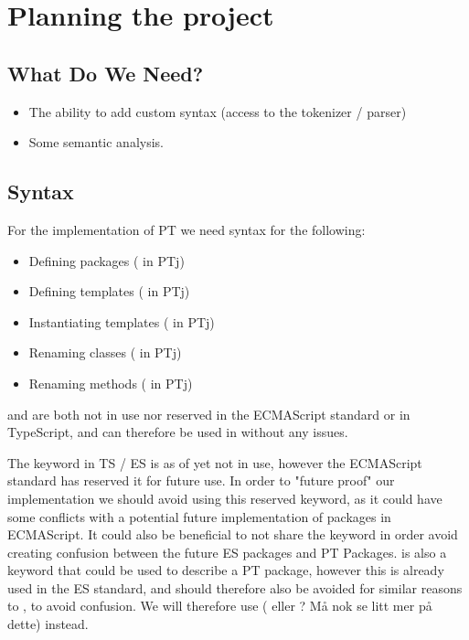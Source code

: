 
\chapter{Planning the project}\label{ch:planning-the-project}

\section{What Do We Need?}\label{sec:what-do-we-need}

\begin{itemize}
    \item The ability to add custom syntax (access to the tokenizer / parser)
    \item Some semantic analysis.
\end{itemize}

\section{Syntax}\label{sec:syntax}

For the implementation of PT we need syntax for the following:

\begin{itemize}
    \item Defining packages ( in PTj)
    \item Defining templates ( in PTj)
    \item Instantiating templates ( in PTj)
    \item Renaming classes (\codeword{=>} in PTj)
    \item Renaming methods (\codeword{->} in PTj)
\end{itemize}

 and  are both not in use nor reserved in the ECMAScript standard or in TypeScript, and can therefore be used in \plname{} without any issues.

The keyword  in TS / ES is as of yet not in use, however the ECMAScript standard has reserved it for future use.
In order to "future proof" our implementation we should avoid using this reserved keyword, as it could have some conflicts with a potential future implementation of packages in ECMAScript.
It could also be beneficial to not share the keyword in order avoid creating confusion between the future ES packages and PT Packages.
 is also a keyword that could be used to describe a PT package, however this is already used in the ES standard, and should therefore also be avoided for similar reasons to , to avoid confusion.
We will therefore use ( eller ? Må nok se litt mer på dette) instead. %

